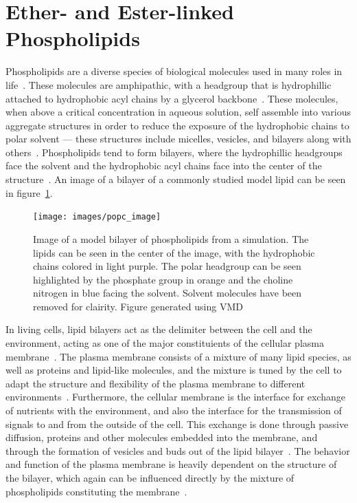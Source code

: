 \documentclass[12pt,openany,final]{book}
\begin{document}
\section{Ether- and Ester-linked Phospholipids}
Phospholipids are a diverse species of biological molecules used in many roles in life~\cite{van:2008:lipidvariety}. These molecules
are amphipathic, with a headgroup that is hydrophillic attached to hydrophobic acyl chains by a
glycerol backbone~\cite{pandit:2008:simulationtextbook,israelachvili:2011:intermol}. 
These molecules, when above a critical concentration in aqueous solution, self assemble into
various aggregate structures in order 
to reduce the exposure of the hydrophobic chains
to polar solvent --- these structures include
micelles, vesicles, and bilayers along with others~\cite{israelachvili:2011:intermol}. 
Phospholipids tend to form bilayers, 
where the hydrophillic headgroups face the solvent and the 
hydrophobic acyl chains face into the center 
of the structure~\cite{israelachvili:2011:intermol,ashrafuzzaman:2012:membrane}. 
An image of a bilayer of a commonly studied
model lipid can be seen
in figure~\ref{fig:boximage}.
\begin{figure}[p]
    \caption[Image of a model bilayer of phospholipids from a simulation.]{ Image of a model bilayer of phospholipids from a simulation. The lipids can be seen
in the center of the image, with the hydrophobic chains colored in
light purple. The polar headgroup can be seen highlighted by the phosphate group in orange and the choline nitrogen in blue
facing the solvent. Solvent molecules have been removed for clairity. Figure generated
using VMD~\cite{vmd}}
\label{fig:boximage}
\texttt{[image: images/popc\_image]}
\end{figure}
In living cells, lipid bilayers act as the delimiter between the cell and the environment, acting as one of the major constituients of the cellular 
plasma membrane~\cite{reece:2014:biobook}. The plasma membrane consists of a mixture of many lipid species, as
well as proteins and lipid-like molecules, and the mixture is tuned by the cell to adapt the 
structure and flexibility of the plasma membrane to different environments~\cite{pandit:2008:simulationtextbook,van:2008:lipidvariety,zhang:2008:memhomeo}. 
Furthermore, the cellular membrane is the interface for exchange
of nutrients with the environment, and also the interface for the transmission of signals to and from the outside of the cell. This
exchange is done through passive diffusion, proteins and other molecules embedded into the membrane, and through the formation
of vesicles and buds out of the lipid bilayer~\cite{reece:2014:biobook}. The behavior and function of the plasma membrane
is heavily dependent on the structure of the bilayer, which again can be influenced directly by the mixture of phospholipids constituting the
membrane~\cite{van:2008:lipidvariety,zhang:2008:memhomeo}.
\end{document}
